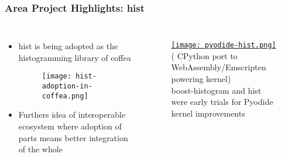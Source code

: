 \begin{frame}
  \frametitle{Area Project Highlights: hist}

  \begin{columns}
    \begin{itemize}\setlength{\itemsep}{0.1 cm}
      \item hist is being adopted as the histogramming library of coffea
      \begin{figure}
        \begin{center}
          \texttt{[image: hist-adoption-in-coffea.png]}
        \end{center}
      \end{figure}
      \item Furthers idea of interoperable ecosystem where adoption of parts means better integration of the whole
    \end{itemize}
%
    \begin{figure}
        \begin{center}
            \href{https://jupyterlite.readthedocs.io/en/latest/_static/lab/index.html}{\texttt{[image: pyodide-hist.png]}}
            {\tiny ( CPython port to WebAssembly/Emscripten powering  kernel)}\\boost-histogram and hist were early trials for Pyodide kernel improvements
        \end{center}
    \end{figure}
  \end{columns}

\end{frame}

